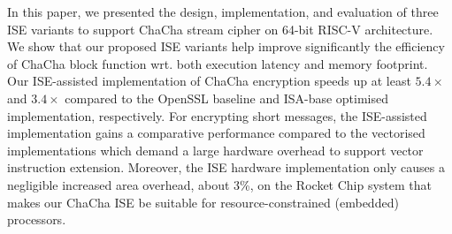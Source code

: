 In this paper, we presented the design, implementation, and evaluation of three ISE variants to support ChaCha stream cipher on 64-bit RISC-V architecture.
We show that our proposed ISE variants help improve significantly the efficiency of ChaCha block function wrt. both execution latency and memory footprint.  
Our ISE-assisted implementation of ChaCha encryption speeds up at least $5.4\times$ and $3.4\times$ compared to the OpenSSL baseline and ISA-base optimised implementation, respectively. 
For encrypting short messages, the ISE-assisted implementation gains a comparative performance compared to the vectorised implementations which demand a large hardware overhead to support vector instruction extension.
Moreover, the ISE hardware implementation only causes a negligible increased area overhead, about 3\%, on the Rocket Chip system that makes our ChaCha ISE be suitable for resource-constrained (embedded) processors.




